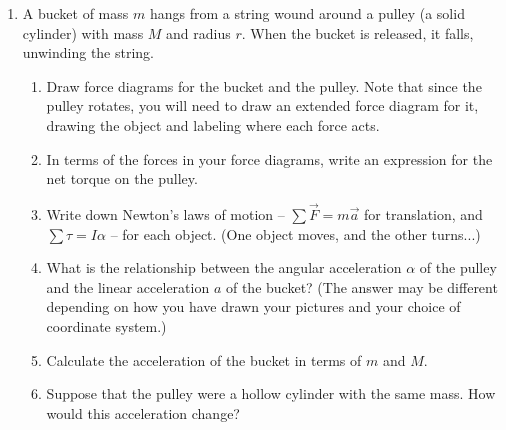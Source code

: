 \documentclass[12pt]{article}
\begin{document}
\Large
\centerline{}
\normalsize
\centerline{}

\begin{enumerate}

\item A bucket of mass $m$ hangs from a string wound around a pulley 
(a solid cylinder) with mass $M$ and radius $r$. When the bucket is
released, it falls, unwinding the string.

\begin{enumerate}

\item Draw force diagrams for the bucket and the pulley. Note that since the pulley rotates, you will need
to draw an extended force diagram for it, drawing the object and labeling where each force acts.

\vspace{3in}

\item In terms of the forces in your force diagrams, write an expression for the net torque on the pulley.

\vspace{1in}

\item Write down Newton's laws of motion -- $\sum \vec F = m \vec a$ for translation, and $\sum \tau = I \alpha$
-- for each object. (One object moves, and the other turns...)

\vspace{2in}


\newpage

\item What is the relationship between the angular acceleration $\alpha$ of the pulley and the linear acceleration
$a$ of the bucket? (The answer may be different depending on how you have drawn your pictures and your choice of
coordinate system.)

\vspace{1in}

\item Calculate the acceleration of the bucket in terms of $m$ and $M$.

\vspace{3in}

\item Suppose that the pulley were a hollow cylinder with the same mass. How would this acceleration change?

\newpage
\end{enumerate}


\end{enumerate}
\end{document}
